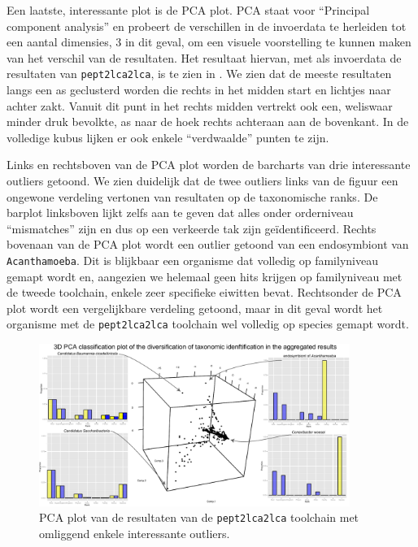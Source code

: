 Een laatste, interessante plot is de PCA plot. PCA staat voor ``Principal
component analysis'' en probeert de verschillen in de invoerdata te herleiden
tot een aantal dimensies, 3 in dit geval, om een visuele voorstelling te kunnen
maken van het verschil van de resultaten. Het resultaat hiervan, met als
invoerdata de resultaten van \texttt{pept2lca2lca}, is te zien in
. We zien dat de meeste resultaten langs een as geclusterd worden
die rechts in het midden start en lichtjes naar achter zakt. Vanuit dit punt in
het rechts midden vertrekt ook een, weliswaar minder druk bevolkte, as naar de
hoek rechts achteraan aan de bovenkant. In de volledige kubus lijken er ook
enkele ``verdwaalde'' punten te zijn.

Links en rechtsboven van de PCA plot worden de barcharts van drie interessante
outliers getoond. We zien duidelijk dat de twee outliers links van de figuur een
ongewone verdeling vertonen van resultaten op de taxonomische ranks. De barplot
linksboven lijkt zelfs aan te geven dat alles onder orderniveau ``mismatches''
zijn en dus op een verkeerde tak zijn geïdentificeerd. Rechts bovenaan van de
PCA plot wordt een outlier getoond van een endosymbiont van
\texttt{Acanthamoeba}. Dit is blijkbaar een organisme dat volledig op
familyniveau gemapt wordt en, aangezien we helemaal geen hits krijgen op
familyniveau met de tweede toolchain, enkele zeer specifieke eiwitten bevat.
Rechtsonder de PCA plot wordt een vergelijkbare verdeling getoond, maar in dit
geval wordt het organisme met de \texttt{pept2lca2lca} toolchain wel volledig op
species gemapt wordt.

\begin{figure}
	\centering
	\includegraphics[width=0.9\textwidth]{includes/newPCA.pdf}
	\caption{PCA plot van de resultaten van de \texttt{pept2lca2lca} toolchain 
	met omliggend enkele interessante outliers.}
	\label{fig:pca}
\end{figure}

